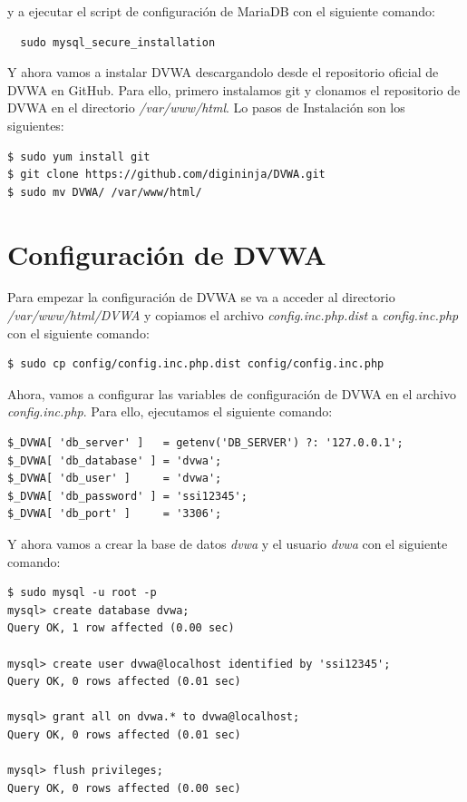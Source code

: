\documentclass[11pt]{report}
\begin{document}
y a ejecutar el script de configuración de MariaDB con el siguiente comando:
\begin{BVerbatim}
  sudo mysql_secure_installation
\end{BVerbatim}

Y ahora vamos a instalar DVWA descargandolo desde el repositorio oficial de DVWA en GitHub. Para ello, primero instalamos git y clonamos el repositorio de DVWA en el directorio
\emph{/var/www/html}. Lo pasos de Instalación son los siguientes:
\begin{verbatim}
$ sudo yum install git
$ git clone https://github.com/digininja/DVWA.git
$ sudo mv DVWA/ /var/www/html/
\end{verbatim}

\section{Configuración de DVWA}
Para empezar la configuración de DVWA se va a acceder al directorio \emph{/var/www/html/DVWA} y copiamos el archivo \emph{config.inc.php.dist} a
\emph{config.inc.php} con el siguiente comando:
\begin{verbatim}
$ sudo cp config/config.inc.php.dist config/config.inc.php
\end{verbatim}

Ahora, vamos a configurar las variables de configuración de DVWA en el archivo \emph{config.inc.php}. Para ello, ejecutamos el siguiente comando:
\begin{verbatim}
$_DVWA[ 'db_server' ]   = getenv('DB_SERVER') ?: '127.0.0.1';
$_DVWA[ 'db_database' ] = 'dvwa';
$_DVWA[ 'db_user' ]     = 'dvwa';
$_DVWA[ 'db_password' ] = 'ssi12345';
$_DVWA[ 'db_port' ]     = '3306';
\end{verbatim}

Y ahora vamos a crear la base de datos \emph{dvwa} y el usuario \emph{dvwa} con el siguiente comando:
\begin{verbatim}
$ sudo mysql -u root -p
mysql> create database dvwa;
Query OK, 1 row affected (0.00 sec)

mysql> create user dvwa@localhost identified by 'ssi12345';
Query OK, 0 rows affected (0.01 sec)

mysql> grant all on dvwa.* to dvwa@localhost;
Query OK, 0 rows affected (0.01 sec)

mysql> flush privileges;
Query OK, 0 rows affected (0.00 sec)
\end{verbatim}
\end{document}
